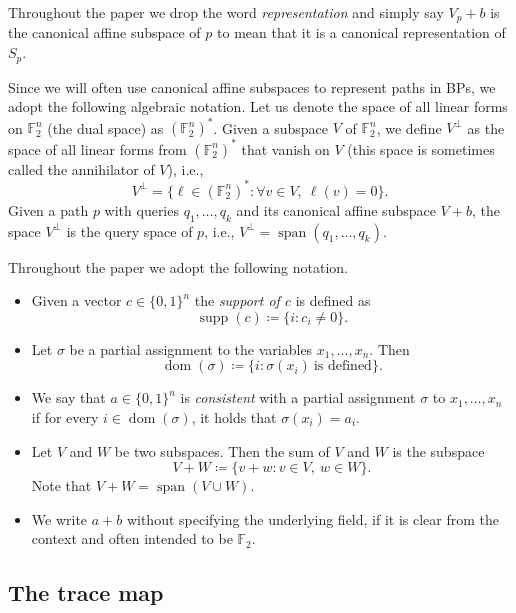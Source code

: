 \documentclass[a4paper,11pt,draft]{article}
\theoremstyle{definition}
\theoremstyle{remark}
\DeclareMathOperator{\supp}{supp}
\DeclareMathOperator{\dom}{dom}
\DeclareMathOperator{\Span}{span}
\newcommand{\dual}[1]{{#1}^{*}}
\newcommand{\orth}[1]{{#1}^{\perp}}
\newcommand{\Q}{{\{0,1\}}}
\newcommand{\bbF}{\mathbb{F}}
\begin{document}
Throughout the paper we drop the word \emph{representation} and simply say $V_p + b$ is the canonical affine subspace of $p$
 to mean that it is a canonical representation of $S_p$.

Since we will often use canonical affine subspaces to represent paths in BPs, we adopt the following algebraic notation.
Let us denote the space of all linear forms on $\bbF_2^n$ (the dual space) as $\dual{(\bbF_2^n)}$.
Given a subspace $V$ of $\bbF_2^n$, we define $\orth{V}$ as the space of all linear forms from $\dual{(\bbF_2^n)}$ that vanish on $V$ (this space is sometimes called the annihilator of $V$), i.e.,
\[
  \orth{V} = \{\ell \in \dual{(\bbF_2^n)} : \forall v \in V,\ \ell(v) = 0\}.
\]
Given a path $p$ with queries $q_1, \ldots, q_k$ and its canonical affine subspace $V+b$, the space $\orth{V}$ is the query space of $p$, i.e., $\orth{V} = \Span(q_1, \ldots, q_k)$.


Throughout the paper we adopt the following notation.
\begin{itemize}
  \item Given a vector $c \in \Q^n$ the \emph{support of $c$} is defined as
  \[
    \supp(c) \coloneqq \{i : c_i \neq 0\}.
  \]

  \item Let $\sigma$ be a partial assignment to the variables $x_1, \ldots, x_n$. Then
  \[
    \dom(\sigma) \coloneqq \{i : \sigma(x_i)\ \text{is defined}\}.
  \]

  \item We say that $a \in \Q^n$ is \emph{consistent} with a partial assignment $\sigma$ to $x_1, \ldots, x_n$ if for every $i \in \dom(\sigma)$, it holds that $\sigma(x_i) = a_i$.
  
  \item Let $V$ and $W$ be two subspaces. Then the sum of $V$ and $W$ is the subspace
  \[
    V+W \coloneqq \{v+w : v \in V,\ w \in W\}.
  \]
  Note that $V + W = \Span(V \cup W)$.

  \item We write $a+b$ without specifying the underlying field, if it is clear from the context and often intended to be $\bbF_2$.
\end{itemize}

\subsection{The trace map}
\end{document}
